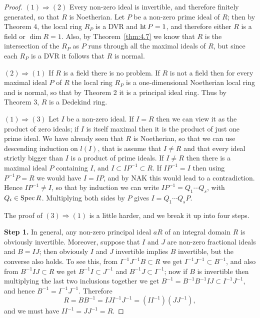 \begin{proof}
$(1) \Rightarrow (2)$ Every non-zero ideal is invertible, and therefore finitely
generated, so that $R$ is Noetherian. Let $P$ be a non-zero prime ideal of $R$;
then by Theorem 4, the local ring $R_P$ is a DVR and $\operatorname{ht} P = 1$, and therefore
either $R$ is a field or $\dim R = 1$. Also, by Theorem~\ref{thm:4.7} we know that $R$ is the
intersection of the $R_P$ as $P$ runs through all the maximal ideals of $R$, but
since each $R_P$ is a DVR it follows that $R$ is normal.

$(2) \Rightarrow (1)$ If $R$ is a field there is no problem. If $R$ is not a field then for every
maximal ideal $P$ of $R$ the local ring $R_P$ is a one-dimensional Noetherian
local ring and is normal, so that by Theorem 2 it is a principal ideal ring.
Thus by Theorem 3, $R$ is a Dedekind ring.

$(1) \Rightarrow (3)$ Let $I$ be a non-zero ideal. If $I = R$ then we can view it as the
product of zero ideals; if $I$ is itself maximal then it is the product of just one
prime ideal. We have already seen that $R$ is Noetherian, so that we can use
descending induction on $l(I)$, that is assume that $I \neq R$ and that every ideal
strictly bigger than $I$ is a product of prime ideals. If $I \neq R$ then there is a
maximal ideal $P$ containing $I$, and $I \subset IP^{-1} \subset R$. If $IP^{-1} = I$ then using
$P^{-1}P = R$ we would have $I = IP$, and by NAK this would lead to a
contradiction. Hence $IP^{-1} \neq I$, so that by induction we can write $IP^{-1} =
Q_1 \cdots Q_s$, with $Q_i \in \operatorname{Spec} R$. Multiplying both sides by $P$ gives $I = Q_1 \cdots Q_sP$.

The proof of $(3) \Rightarrow (1)$ is a little harder, and we break it up into four steps.

\textbf{Step 1.} In general, any non-zero principal ideal $aR$ of an integral domain $R$
is obviously invertible. Moreover, suppose that $I$ and $J$ are non-zero
fractional ideals and $B = IJ$; then obviously $I$ and $J$ invertible implies $B$
invertible, but the converse also holds. To see this, from $I^{-1}J^{-1}B \subset R$ we
get $I^{-1}J^{-1} \subset B^{-1}$, and also from $B^{-1}IJ \subset R$ we get $B^{-1}I \subset J^{-1}$ and
$B^{-1}J \subset I^{-1}$; now if $B$ is invertible then multiplying the last two inclusions
together we get $B^{-1} = B^{-1}B^{-1}IJ \subset I^{-1}J^{-1}$, and hence $B^{-1} = I^{-1}J^{-1}$.
Therefore
\[
  R = BB^{-1} = IJI^{-1}J^{-1} = (II^{-1})(JJ^{-1}),
\]
and we must have $II^{-1} = JJ^{-1} = R$.


\end{proof}

